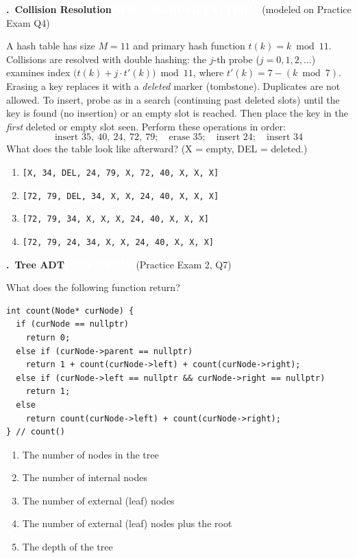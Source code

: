 \documentclass[11pt]{article}
\newcounter{qnum}
\newcommand{\tagpast}[1]{\colorbox{pastc}{\textcolor{white}{\footnotesize\textbf{PAST EXAM}}}\ {\footnotesize\textcolor{pastc}{(#1)}}}
\newcommand{\tagnew}[1]{\colorbox{newc}{\textcolor{white}{\footnotesize\textbf{NEW -- SIMILAR PATTERN}}}\ {\footnotesize\textcolor{newc}{(modeled on #1)}}}
\newcommand{\question}[2]{\par\needspace{8\baselineskip}\medskip\stepcounter{qnum}%
  \noindent\textbf{\theqnum.\ #1}\hfill #2\par\nobreak\smallskip}
\newenvironment{choices}{\begin{enumerate}[label=\textbf{\Alph*)}, nosep, leftmargin=2.5em]}{\end{enumerate}}
\begin{document}
\question{Collision Resolution}{\tagnew{Practice Exam Q4}}
A hash table has size $M = 11$ and primary hash function $t(k) = k \bmod 11$. Collisions are resolved with
double hashing: the $j$-th probe ($j = 0, 1, 2, \ldots$) examines index $\big(t(k) + j \cdot t'(k)\big) \bmod 11$,
where $t'(k) = 7 - (k \bmod 7)$. Erasing a key replaces it with a \emph{deleted} marker (tombstone).
Duplicates are not allowed. To insert, probe as in a search (continuing past deleted slots) until the key is found
(no insertion) or an empty slot is reached. Then place the key in the \emph{first} deleted or empty slot seen.
Perform these operations in order:
\[ \text{insert } 35,\ 40,\ 24,\ 72,\ 79;\quad \text{erase } 35;\quad \text{insert } 24;\quad \text{insert } 34 \]
What does the table look like afterward? (X = empty, DEL = deleted.)
\begin{choices}
  \item \texttt{[X, 34, DEL, 24, 79, X, 72, 40, X, X, X]}
  \item \texttt{[72, 79, DEL, 34, X, X, 24, 40, X, X, X]}
  \item \texttt{[72, 79, 34, X, X, X, 24, 40, X, X, X]}
  \item \texttt{[72, 79, 24, 34, X, X, 24, 40, X, X, X]}
\end{choices}

\question{Tree ADT}{\tagpast{Practice Exam 2, Q7}}
What does the following function return?
\begin{lstlisting}
int count(Node* curNode) {
  if (curNode == nullptr)
    return 0;
  else if (curNode->parent == nullptr)
    return 1 + count(curNode->left) + count(curNode->right);
  else if (curNode->left == nullptr && curNode->right == nullptr)
    return 1;
  else
    return count(curNode->left) + count(curNode->right);
} // count()
\end{lstlisting}
\begin{choices}
  \item The number of nodes in the tree
  \item The number of internal nodes
  \item The number of external (leaf) nodes
  \item The number of external (leaf) nodes plus the root
  \item The depth of the tree
\end{choices}
\end{document}
